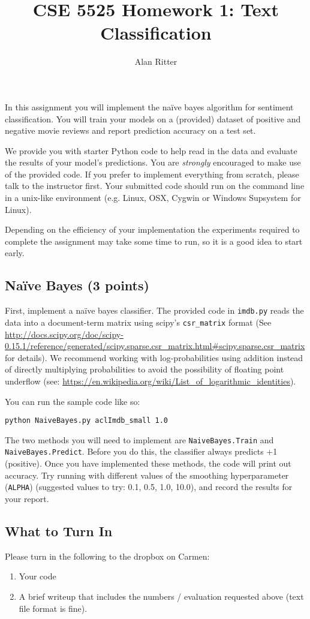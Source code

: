 \documentclass[12pt, letterpaper]{article}
\begin{document}
\title{CSE 5525 Homework 1: Text Classification}
\author{Alan Ritter}
\date{}
\maketitle
 
In this assignment you will implement the na\"{i}ve bayes algorithm for
sentiment classification.  You will train your models on a (provided) dataset of positive
and negative movie reviews and report prediction accuracy on a test set.

We provide you with starter Python code to help read in the data and evaluate the results of your model's predictions.
You are \emph{strongly} encouraged to make use of the provided code.  
If you prefer to implement everything from scratch, please talk to the instructor first.  Your submitted code
should run on the command line in a unix-like environment (e.g. Linux, OSX, Cygwin or Windows Supsystem for Linux).

Depending on the efficiency of your implementation the experiments required to complete the assignment may take some
time to run, so it is a good idea to start early.

\subsection*{Na\"{i}ve Bayes (3 points)}
First, implement a na\"{i}ve bayes classifier.  The provided code in {\tt imdb.py} reads the data into a document-term matrix
using scipy's {\tt csr\_matrix} format (See \url{http://docs.scipy.org/doc/scipy-0.15.1/reference/generated/scipy.sparse.csr_matrix.html#scipy.sparse.csr_matrix} for details).
We recommend working with log-probabilities using addition instead of directly multiplying probabilities to avoid the possibility of floating point underflow (see: \url{https://en.wikipedia.org/wiki/List_of_logarithmic_identities}).

You can run the sample code like so:
\begin{verbatim}
python NaiveBayes.py aclImdb_small 1.0
\end{verbatim}

The two methods you will need to implement are {\tt NaiveBayes.Train} and {\tt NaiveBayes.Predict}.  Before you do this, the classifier always predicts +1 (positive).
Once you have implemented these methods, the code will print out accuracy.  Try running with different values of the smoothing hyperparameter ({\tt ALPHA}) (suggested values to try: 0.1, 0.5, 1.0, 10.0),
and record the results for your report.

\subsection*{What to Turn In}
Please turn in the following to the dropbox on Carmen:

\begin{enumerate}
  \item Your code
  \item A brief writeup that includes the numbers / evaluation requested above (text file format is fine).
\end{enumerate}
\end{document}
